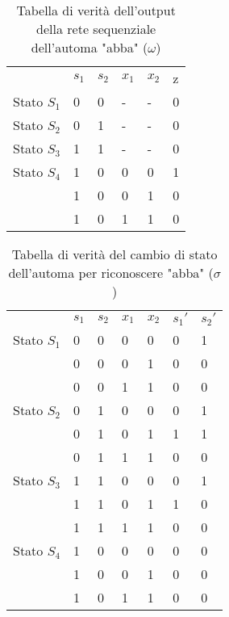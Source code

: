 \begin{table}[H]
	\centering
	\caption{Tabella di verità dell'output della rete sequenziale dell'automa "abba" ($ \omega $)}
	\label{tab:mealyomega2}
	\begin{tabular}{l|llll|l|}
		\cline{2-6}
		& $s_1$ & $s_2$ & $x_1$ & $x_2$ & z \\ \cline{2-6}
		Stato $S_1$ & 0     & 0     & -     & -     & 0 \\
		Stato $S_2$ & 0     & 1     & -     & -     & 0 \\
		Stato $S_3$ & 1     & 1     & -     & -     & 0 \\
		Stato $S_4$ & 1     & 0     & 0     & 0     & 1 \\
		& 1     & 0     & 0     & 1     & 0 \\
		& 1     & 0     & 1     & 1     & 0 \\ \cline{2-6} 
	\end{tabular}
\end{table}

\begin{table}[H]
	\centering
	\caption{Tabella di verità del cambio di stato dell'automa per riconoscere "abba" ($\sigma$)}
	\label{tab:mealysigma2}
	\begin{tabular}{l|llll|ll|}
		\cline{2-7}
		& $s_1$ & $s_2$ & $x_1$ & $x_2$ & $s_1'$ & $s_2'$ \\ \cline{2-7} 
		Stato $S_1$ & 0     & 0     & 0     & 0     & 0      & 1      \\
		& 0     & 0     & 0     & 1     & 0      & 0      \\
		& 0     & 0     & 1     & 1     & 0      & 0      \\ \cline{2-7} 
		Stato $S_2$ & 0     & 1     & 0     & 0     & 0      & 1      \\
		& 0     & 1     & 0     & 1     & 1      & 1      \\
		& 0     & 1     & 1     & 1     & 0      & 0      \\ \cline{2-7} 
		Stato $S_3$ & 1     & 1     & 0     & 0     & 0      & 1      \\
		& 1     & 1     & 0     & 1     & 1      & 0      \\
		& 1     & 1     & 1     & 1     & 0      & 0      \\ \cline{2-7}
		Stato $S_4$ & 1     & 0     & 0     & 0     & 0      & 0      \\
		& 1     & 0     & 0     & 1     & 0      & 0      \\
		& 1     & 0     & 1     & 1     & 0      & 0      \\ \cline{2-7}
	\end{tabular}
\end{table}

